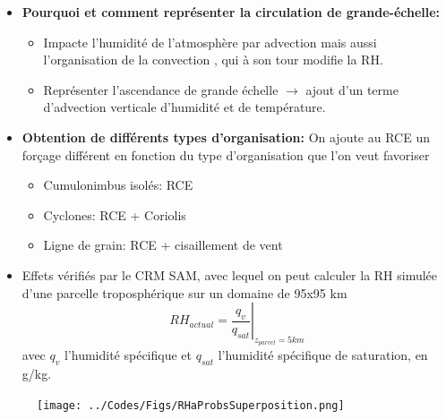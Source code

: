 \documentclass[10pt]{beamer}
\begin{document}
\begin{frame}{\secname}
    \begin{itemize}
        \item \textbf{Pourquoi et comment représenter la circulation de grande-échelle:} 
        \begin{itemize}
            \item Impacte l'humidité de l'atmosphère par advection mais aussi l'organisation de la convection \autocite{dufauxRapportStageLicence2021}, qui à son tour modifie la RH. 
            \item Représenter l’ascendance de grande échelle $\rightarrow$ ajout d'un terme d’advection verticale d’humidité et de température.
        \end{itemize}
        \item \textbf{Obtention de différents types d'organisation:} On ajoute au RCE un forçage différent en fonction du type d'organisation que l'on veut favoriser
        \begin{itemize}
            \item Cumulonimbus isolés: RCE
            \item Cyclones: RCE + Coriolis
            \item Ligne de grain: RCE + cisaillement de vent
        \end{itemize}
    \end{itemize}

\end{frame}

\begin{frame}{\secname}

    \begin{itemize}
        \item Effets vérifiés par le CRM SAM, avec lequel on peut calculer la RH simulée d'une parcelle troposphérique sur un domaine de 95x95 km
        $$
        RH_{actual} = \left.\frac{q_v}{q_{sat}}\right|_{z_{parcel}=5km}
        $$
        avec $q_v$ l'humidité spécifique et $q_{sat}$ l'humidité spécifique de saturation, en g/kg.
    \end{itemize}

\end{frame}

\begin{frame}{\secname}
    
    \begin{figure}
        \centering
        \texttt{[image: ../Codes/Figs/RHaProbsSuperposition.png]}
        \label{RHactual}
    \end{figure}

\end{frame}
\end{document}
